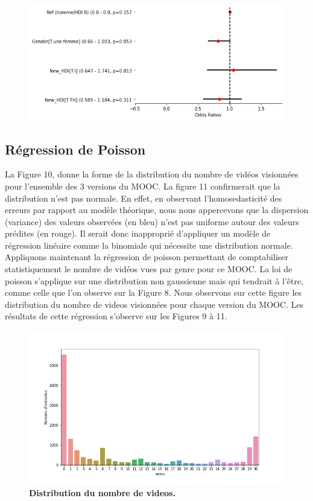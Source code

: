 \documentclass[12pt, a4paper, titlepage, table]{article}
\begin{document}
\begin{figure}[H]
	\centering
	\includegraphics[width=1\textwidth]{../../graph/forestplot_V2_binomiale.png}
\end{figure}

\subsection{Régression de Poisson}
La Figure 10, donne la forme de la distribution du nombre de vidéos visionnées pour l'ensemble des 3 versions du MOOC.
La figure 11 confirmerait que la distribution n'est pas normale. En effet, en observant l'homosedasticité des erreurs par 
rapport au modèle théorique, nous nous appercevons que la dispersion (variance) des valeurs observées (en bleu)
n'est pas uniforme autour des valeurs prédites (en rouge). 
Il serait donc inapproprié d'appliquer un modèle de régression linéaire comme la binomiale qui nécessite une distribution normale.
Appliquons maintenant la régression de poisson permettant de comptabiliser statistiquement le nombre de vidéos vues par
genre pour ce MOOC. La loi de poisson s'applique sur une distribution non gaussienne mais qui tendrait à l'être, comme celle que l'on
observe sur la Figure 8. Nous observons sur cette figure les distribution du nombre de videos visionnées pour chaque version du MOOC.
Les résultats de cette régression s'observe sur les Figures 9 à 11.

\begin{figure}[H]
	\centering
	\includegraphics[width=1\textwidth]{../../graph/distribution_poisson.png}
	\caption{\textbf{Distribution du nombre de videos.}}
\end{figure}
\end{document}
